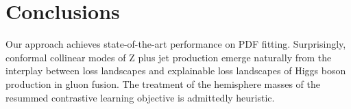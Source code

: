 \section{Conclusions}\label{sec:conclusions}

Our approach achieves state-of-the-art performance on PDF fitting.
Surprisingly, conformal collinear modes of Z plus jet production emerge
naturally from the interplay between loss landscapes and explainable
loss landscapes of Higgs boson production in gluon fusion. The treatment
of the hemisphere masses of the resummed contrastive learning objective
is admittedly heuristic.

